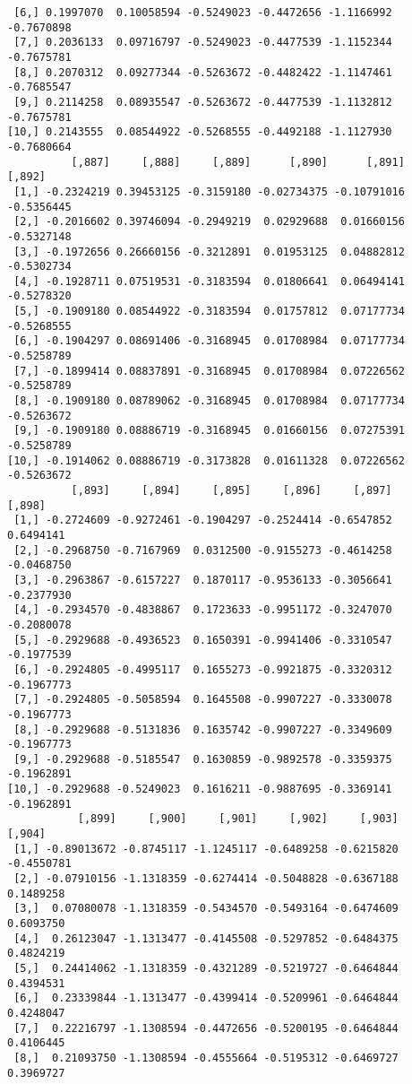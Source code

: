 \documentclass[
  letterpaper,
  DIV=11,
  numbers=noendperiod]{scrreprt}
\begin{document}
\begin{verbatim}
 [6,] 0.1997070  0.10058594 -0.5249023 -0.4472656 -1.1166992 -0.7670898
 [7,] 0.2036133  0.09716797 -0.5249023 -0.4477539 -1.1152344 -0.7675781
 [8,] 0.2070312  0.09277344 -0.5263672 -0.4482422 -1.1147461 -0.7685547
 [9,] 0.2114258  0.08935547 -0.5263672 -0.4477539 -1.1132812 -0.7675781
[10,] 0.2143555  0.08544922 -0.5268555 -0.4492188 -1.1127930 -0.7680664
          [,887]     [,888]     [,889]      [,890]      [,891]     [,892]
 [1,] -0.2324219 0.39453125 -0.3159180 -0.02734375 -0.10791016 -0.5356445
 [2,] -0.2016602 0.39746094 -0.2949219  0.02929688  0.01660156 -0.5327148
 [3,] -0.1972656 0.26660156 -0.3212891  0.01953125  0.04882812 -0.5302734
 [4,] -0.1928711 0.07519531 -0.3183594  0.01806641  0.06494141 -0.5278320
 [5,] -0.1909180 0.08544922 -0.3183594  0.01757812  0.07177734 -0.5268555
 [6,] -0.1904297 0.08691406 -0.3168945  0.01708984  0.07177734 -0.5258789
 [7,] -0.1899414 0.08837891 -0.3168945  0.01708984  0.07226562 -0.5258789
 [8,] -0.1909180 0.08789062 -0.3168945  0.01708984  0.07177734 -0.5263672
 [9,] -0.1909180 0.08886719 -0.3168945  0.01660156  0.07275391 -0.5258789
[10,] -0.1914062 0.08886719 -0.3173828  0.01611328  0.07226562 -0.5263672
          [,893]     [,894]     [,895]     [,896]     [,897]     [,898]
 [1,] -0.2724609 -0.9272461 -0.1904297 -0.2524414 -0.6547852  0.6494141
 [2,] -0.2968750 -0.7167969  0.0312500 -0.9155273 -0.4614258 -0.0468750
 [3,] -0.2963867 -0.6157227  0.1870117 -0.9536133 -0.3056641 -0.2377930
 [4,] -0.2934570 -0.4838867  0.1723633 -0.9951172 -0.3247070 -0.2080078
 [5,] -0.2929688 -0.4936523  0.1650391 -0.9941406 -0.3310547 -0.1977539
 [6,] -0.2924805 -0.4995117  0.1655273 -0.9921875 -0.3320312 -0.1967773
 [7,] -0.2924805 -0.5058594  0.1645508 -0.9907227 -0.3330078 -0.1967773
 [8,] -0.2929688 -0.5131836  0.1635742 -0.9907227 -0.3349609 -0.1967773
 [9,] -0.2929688 -0.5185547  0.1630859 -0.9892578 -0.3359375 -0.1962891
[10,] -0.2929688 -0.5249023  0.1616211 -0.9887695 -0.3369141 -0.1962891
           [,899]     [,900]     [,901]     [,902]     [,903]     [,904]
 [1,] -0.89013672 -0.8745117 -1.1245117 -0.6489258 -0.6215820 -0.4550781
 [2,] -0.07910156 -1.1318359 -0.6274414 -0.5048828 -0.6367188  0.1489258
 [3,]  0.07080078 -1.1318359 -0.5434570 -0.5493164 -0.6474609  0.6093750
 [4,]  0.26123047 -1.1313477 -0.4145508 -0.5297852 -0.6484375  0.4824219
 [5,]  0.24414062 -1.1318359 -0.4321289 -0.5219727 -0.6464844  0.4394531
 [6,]  0.23339844 -1.1313477 -0.4399414 -0.5209961 -0.6464844  0.4248047
 [7,]  0.22216797 -1.1308594 -0.4472656 -0.5200195 -0.6464844  0.4106445
 [8,]  0.21093750 -1.1308594 -0.4555664 -0.5195312 -0.6469727  0.3969727

\end{verbatim}
\end{document}
